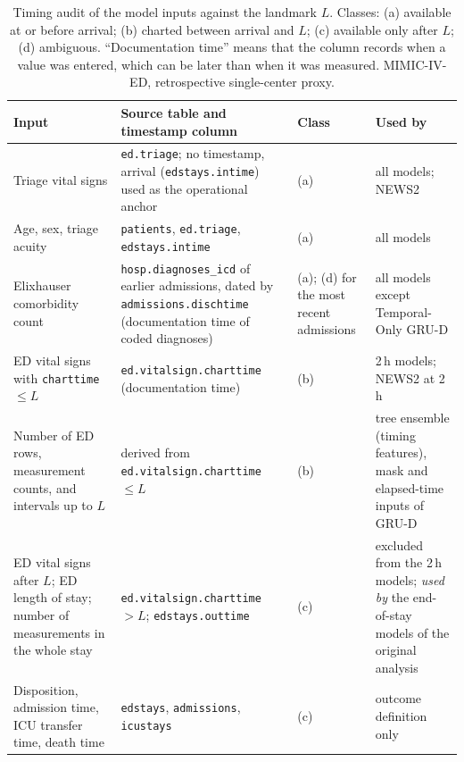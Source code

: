 \begin{table}[t]
\centering
\caption{Timing audit of the model inputs against the landmark $L$. Classes: (a) available at or before arrival; (b) charted between arrival and $L$; (c) available only after $L$;
(d) ambiguous. ``Documentation time'' means that the column records when a value was entered, which can be later than when it was measured. MIMIC-IV-ED, retrospective single-center proxy.}
\label{tab:timing}
\begin{tabular}{p{3.9cm}p{6.6cm}p{1.2cm}p{4.2cm}}
\toprule
Input & Source table and timestamp column & Class & Used by \\
\midrule
Triage vital signs & \texttt{ed.triage}; no timestamp, arrival (\texttt{edstays.intime}) used as the operational anchor & (a) & all models; NEWS2 \\
Age, sex, triage acuity & \texttt{patients}, \texttt{ed.triage}, \texttt{edstays.intime} & (a) & all models \\
Elixhauser comorbidity count & \texttt{hosp.diagnoses\_icd} of earlier admissions, dated by \texttt{admissions.dischtime} (documentation time of coded diagnoses) & (a); (d) for the most recent admissions & all models except Temporal-Only GRU-D \\
ED vital signs with \texttt{charttime} $\le L$ & \texttt{ed.vitalsign.charttime} (documentation time) & (b) & 2\,h models; NEWS2 at 2\,h \\
Number of ED rows, measurement counts, and intervals up to $L$ & derived from \texttt{ed.vitalsign.charttime} $\le L$ & (b) & tree ensemble (timing features), mask and elapsed-time inputs of GRU-D \\
ED vital signs after $L$; ED length of stay; number of measurements in the whole stay & \texttt{ed.vitalsign.charttime} $> L$; \texttt{edstays.outtime} & (c) & excluded from the 2\,h models; \emph{used by} the end-of-stay models of the original analysis \\
Disposition, admission time, ICU transfer time, death time & \texttt{edstays}, \texttt{admissions}, \texttt{icustays} & (c) & outcome definition only \\
\bottomrule
\end{tabular}
\end{table}
